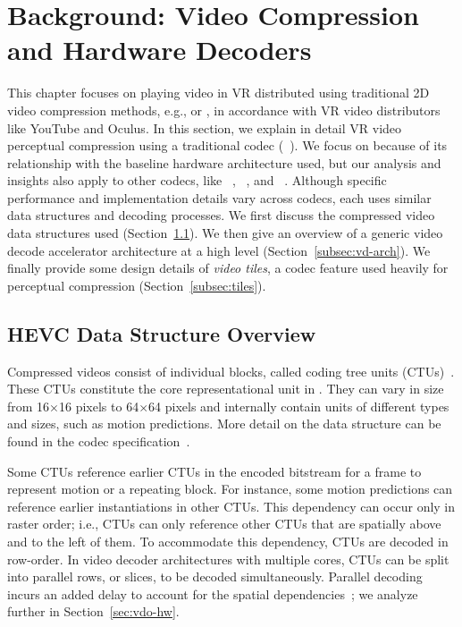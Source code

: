 \section{Background: Video Compression and Hardware Decoders}
\vdecBaselineArchFigure

This chapter focuses on playing video in VR distributed using traditional 2D video compression methods, e.g., \hevc or \vpnine, in accordance with VR video distributors like YouTube and Oculus.
In this section, we explain in detail VR video perceptual compression using a traditional codec (\hevc~\cite{hevc}).
We focus on \hevc because of its relationship with the baseline hardware architecture used, but our analysis and insights also apply to other codecs, like \vpnine~\cite{mukherjee2015technical}, \avc~\cite{h264spec}, and \avone~\cite{avone}.
Although specific performance and implementation details vary across codecs, each uses similar data structures and decoding processes.
We first discuss the compressed video data structures used (Section~\ref{subsec:hevc}).
We then give an overview of a generic video decode accelerator architecture at a high level (Section~\ref{subsec:vd-arch}).
We finally provide some design details of \emph{video tiles}, a codec feature used heavily for perceptual compression (Section~\ref{subsec:tiles}).

\subsection{HEVC Data Structure Overview}
\label{subsec:hevc}

Compressed \hevc videos consist of individual blocks, called coding tree units (CTUs)~\cite{hevc}.
These CTUs constitute the core representational unit in \hevc.
They can vary in size from 16$\times$16 pixels to 64$\times$64 pixels and internally contain units of different types and sizes, such as motion predictions.
More detail on the \hevc data structure can be found in the codec specification~\cite{hevc}.

Some CTUs reference earlier CTUs in the encoded bitstream for a frame to represent motion or a repeating block.
For instance, some motion predictions can reference earlier instantiations in other CTUs.
This dependency can occur only in raster order; i.e., CTUs can only reference other CTUs that are spatially above and to the left of them.
To accommodate this dependency, CTUs are decoded in row-order.
In video decoder architectures with multiple cores, CTUs can be split into parallel rows, or slices, to be decoded simultaneously.
Parallel decoding incurs an added delay to account for the spatial dependencies~\cite{hevcThesis}; we analyze further in Section~\ref{sec:vdo-hw}.

